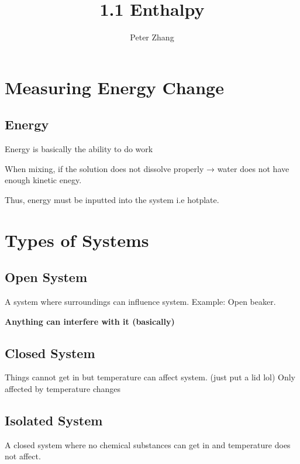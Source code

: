 \documentclass[12pt]{article} %
\title{1.1 Enthalpy}
\author{Peter Zhang}
\begin{document}
\maketitle

\pagebreak

\tableofcontents

\pagebreak

\singlespace

\section{Measuring Energy Change}

\subsection{Energy}

Energy is basically the ability to do work

When mixing, if the solution does not dissolve properly → water does not have enough kinetic enegy.

Thus, energy must be inputted into the system i.e hotplate.

\section{Types of Systems}

\subsection{Open System}

A system where surroundings can influence system. Example: Open beaker.

\textbf{Anything can interfere with it (basically)}

\subsection{Closed System}

Things cannot get in but temperature can affect system. (just put a lid lol)
Only affected by temperature changes

\subsection{Isolated System}

A closed system where no chemical substances can get in and temperature does not affect.
\end{document}

